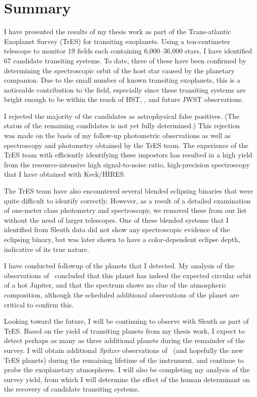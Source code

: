\chapter[Summary]{%
Summary}
\label{cha:discuss}

I have presented the results of my thesis work as part of the Trans-atlantic Exoplanet Survey (TrES) for transiting exoplanets.
Using a ten-centimeter telescope to monitor 19 fields each containing 6,000--36,000 stars, I have identified 67 candidate transiting systems.
To date, three of these have been confirmed by determining the spectroscopic orbit of the host star caused by the planetary companion.
Due to the small number of known transiting exoplanets, this is a noticeable contribution to the field, especially since these transiting systems are bright enough to be within the reach of HST, {\spi}, and future JWST observations.

I rejected the majority of the candidates as astrophysical false positives.
(The status of the remaining candidates is not yet fully determined.)
This rejection was made on the basis of my follow-up photometric observations as well as spectroscopy and photometry obtained by the TrES team.
The experience of the TrES team with efficiently identifying these impostors has resulted in a high yield from the resource-intensive high signal-to-noise ratio, high-precision spectroscopy that I have obtained with Keck/HIRES.

The TrES team have also encountered several blended eclipsing binaries that were quite difficult to identify correctly.
However, as a result of a detailed examination of one-meter class photometry and spectroscopy, we removed these from our list without the need of larger telescopes.
One of these blended systems that I identified from Sleuth data did not show any spectroscopic evidence of the eclipsing binary, but was later shown to have a color-dependent eclipse depth, indicative of its true nature.

I have conducted followup of the planets that I detected.
My analysis of the {\spi} observations of \tresTwo\ concluded that this planet has indeed the expected circular orbit of a hot Jupiter, and that the spectrum shows no clue of the atmospheric composition, although the scheduled additional observations of the planet are critical to confirm this.

Looking toward the future, I will be continuing to observe with Sleuth as part of TrES.
Based on the yield of transiting planets from my thesis work, I expect to detect perhaps as many as three additional planets during the remainder of the survey.
I will obtain additional {\it Spitzer} observations of \tresTwo\ (and hopefully the new TrES planets) during the remaining lifetime of the instrument, and continue to probe the exoplanetary atmospheres.
I will also be completing my analysis of the survey yield, from which I will determine the effect of the human determinant on the recovery of candidate transiting systems.
